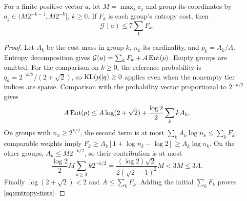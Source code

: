 \begin{lemma}\label{lem:entropy-tiers}
For a finite positive vector $a$, let $M=\max_j a_j$ and group its
coordinates by $a_j\in(M2^{-k-1},M2^{-k}]$, $k\ge0$.
If $F_k$ is each group's entropy cost, then
\begin{equation}\label{eq:entropy-tiers}
 \mathcal G(a)\le7\sum_k F_k.
\end{equation}
\end{lemma}

\begin{proof}
Let $A_k$ be the cost mass in group $k$, $n_k$ its cardinality, and
$p_k=A_k/A$. Entropy decomposition gives
$\mathcal G(a)=\sum_kF_k+A\operatorname{Ent}(p)$.
Empty groups are omitted. For the comparison on $k\ge0$, the reference
probability is $q_k=2^{-k/2}/(2+\sqrt2)$, so $\operatorname{KL}(p\Vert q)\ge0$
applies even when the nonempty tier indices are sparse.
Comparison with the probability vector proportional to $2^{-k/2}$ gives
\[
 A\operatorname{Ent}(p)\le A\log(2+\sqrt2)
                 +\frac{\log2}{2}\sum_k kA_k.
\]
On groups with $n_k\ge2^{k/2}$, the second term is at most
$\sum_kA_k\log n_k\le\sum_kF_k$; comparable weights imply
$F_k\ge A_k[1+\log n_k-\log2]\ge A_k\log n_k$.
On the other groups, $A_k\le M2^{-k/2}$, so their contribution is at most
\[
 \frac{\log2}{2}M\sum_{k\ge0}k2^{-k/2}
 =\frac{(\log2)\sqrt2}{2(\sqrt2-1)^2}M<3M\le3A.
 \]
Finally $\log(2+\sqrt2)<2$ and $A\le\sum_kF_k$.
Adding the initial $\sum_kF_k$ proves \eqref{eq:entropy-tiers}.
\end{proof}
